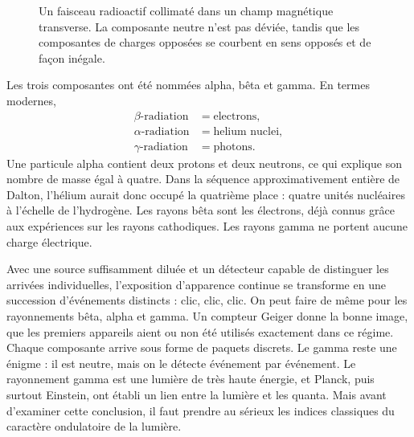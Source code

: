 \begin{figure}[h]\centering
{}\caption{Un faisceau radioactif collimaté dans un champ magnétique transverse. La composante neutre n’est pas déviée, tandis que les composantes de charges opposées se courbent en sens opposés et de façon inégale.}\end{figure}

Les trois composantes ont été nommées alpha, bêta et gamma. En termes modernes,
\begin{equation}
\begin{aligned}
\beta\text{-radiation} &= \text{electrons},\\
\alpha\text{-radiation} &= \text{helium nuclei},\\
\gamma\text{-radiation} &= \text{photons}.
\end{aligned}
\end{equation}
Une particule alpha contient deux protons et deux neutrons, ce qui explique son nombre de masse égal à quatre. Dans la séquence approximativement entière de Dalton, l’hélium aurait donc occupé la quatrième place : quatre unités nucléaires à l’échelle de l’hydrogène. Les rayons bêta sont les électrons, déjà connus grâce aux expériences sur les rayons cathodiques. Les rayons gamma ne portent aucune charge électrique.

Avec une source suffisamment diluée et un détecteur capable de distinguer les arrivées individuelles, l’exposition d’apparence continue se transforme en une succession d’événements distincts : clic, clic, clic. On peut faire de même pour les rayonnements bêta, alpha et gamma. Un compteur Geiger donne la bonne image, que les premiers appareils aient ou non été utilisés exactement dans ce régime. Chaque composante arrive sous forme de paquets discrets. Le gamma reste une énigme : il est neutre, mais on le détecte événement par événement. Le rayonnement gamma est une lumière de très haute énergie, et Planck, puis surtout Einstein, ont établi un lien entre la lumière et les quanta. Mais avant d’examiner cette conclusion, il faut prendre au sérieux les indices classiques du caractère ondulatoire de la lumière.


